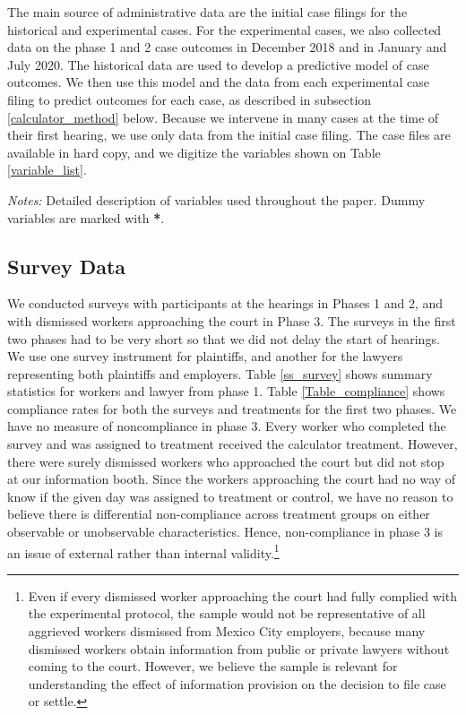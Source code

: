 The main source of administrative data are the initial case filings for the historical and experimental cases. For the experimental cases, we also collected data on the phase 1 and 2 case outcomes in December 2018 and in January and July  2020. The historical data are used to develop a predictive model of case outcomes. We then use this model and the data from each experimental case filing to predict outcomes for each case, as described in subsection \ref{calculator_method} below. Because we intervene in many cases at the time of their first hearing, we use only data from the initial case filing. The case files are available in hard copy, and we digitize the variables shown on Table \ref{variable_list}. 

\begin{table}[!ht]
    \caption{Casefile Variable}
    \label{variable_list}
    \begin{center}
        \scriptsize{}
    \end{center}
     \scriptsize
    \textit{Notes:} 
Detailed description of variables used throughout the paper. Dummy variables are marked with \textbf{*}.
\end{table}


\FloatBarrier

\subsection{Survey Data}

We conducted surveys with participants at the hearings in Phases 1 and 2, and with dismissed workers approaching the court in Phase 3. The surveys in the first two phases had to be very short so that we did not delay the start of hearings. We use one survey instrument for plaintiffs, and another for the lawyers representing both plaintiffs and employers. Table \ref{ss_survey} shows summary statistics for workers and lawyer from phase 1. Table \ref{Table_compliance} shows compliance rates for both the surveys and treatments for the first two phases. We have no measure of noncompliance in phase 3. Every worker who completed the survey and was assigned to treatment received the calculator treatment. However, there were surely dismissed workers who approached the court but did not stop at our information booth. Since the workers approaching the court had no way of know if the given day was assigned to treatment or control, we have no reason to believe there is differential non-compliance across treatment groups on either observable or unobservable characteristics. Hence, non-compliance in phase 3 is an issue of external rather than internal validity.\footnote{Even if every dismissed worker approaching the court had fully complied with the experimental protocol, the sample would not be representative of all aggrieved workers dismissed from Mexico City employers, because many dismissed workers obtain information from public or private lawyers without coming to the court. However, we believe the sample is relevant for understanding the effect of information provision on the decision to file case or settle.}  

